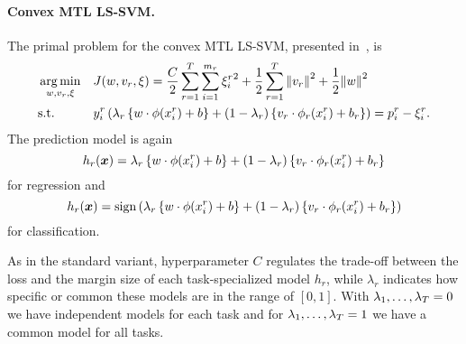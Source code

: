 \paragraph*{{Convex} MTL LS-SVM.\\}
The primal problem for the convex MTL LS-SVM, presented in~\cite{RuizAD21}, is
\begin{equation}\label{eq:svmmtl_primal_convex_ls}
    \begin{aligned}
    & \argmin_{w, {v}_r, \xi}
    & & {J({w}, {v}_r, \xi) = \frac{C}{2} \sum_{r= 1}^T \sum_{i=1}^{m_r} {\xi_{i}^r}^2 + \frac{1}{2} \sum_{r= 1}^T{\norm{{v}_r}^2} + \frac{1}{2} {\norm{{w}}}^2} \\
    & \text{s.t.}
    & & y_{i}^r \left(\lambda_r \left\lbrace {w} \cdot \phi(x_{i}^r) + b  \right\rbrace + (1 - \lambda_r) \left\lbrace {v}_r \cdot \phi_r(x_{i}^r) + b_r \right\rbrace  \right) = p_{i}^r - \xi_{i}^r .  \\
    \end{aligned}
\end{equation}
The prediction model is again
\begin{equation}
    \nonumber
    h_r(\bm{x}) = \lambda_r \left\lbrace {w} \cdot \phi(x_{i}^r) + b  \right\rbrace + (1 - \lambda_r) \left\lbrace {v}_r \cdot \phi_r(x_{i}^r) + b_r \right\rbrace
\end{equation}
for regression and 
\begin{equation}
    \nonumber
    h_r(\bm{x}) = \operatorname{sign}{ \left(\lambda_r \left\lbrace {w} \cdot \phi(x_{i}^r) + b  \right\rbrace + (1 - \lambda_r) \left\lbrace {v}_r \cdot \phi_r(x_{i}^r) + b_r \right\rbrace \right)}
\end{equation}
for classification.
%

As in the standard variant, hyperparameter $C$ regulates the trade-off between the loss and the margin size of each task-specialized model $h_r$, while $\lambda_r$ indicates how specific or common these models are in the range of $[0, 1]$. With $\lambda_1, \ldots, \lambda_T=0$ we have independent models for each task and for $\lambda_1, \ldots, \lambda_T=1$ we have a common model for all tasks. 
 


